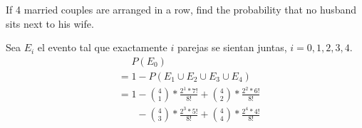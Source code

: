 \item If 4 married couples are arranged in a row, find the probability that no husband sits next to his wife.

Sea $E_i$ el evento tal que exactamente $i$ parejas se sientan juntas, $i = 0,1,2,3,4$.
\begin{align*}
    &\phantom{{}={}} P(E_0)\\
    &= 1 - P(E_1 \cup E_2 \cup E_3 \cup E_4)\\
    &= 1 - \binom{4}{1} * \frac{2^1 * 7!}{8!} 
    +  \binom{4}{2} * \frac{2^2 * 6!}{8!}\\
    &\phantom{{}= 1} -
       \binom{4}{3} * \frac{2^3 * 5!}{8!} 
    +  \binom{4}{4} * \frac{2^4 * 4!}{8!}
\end{align*}